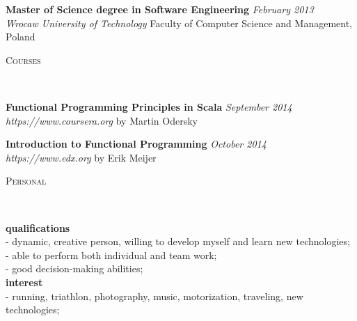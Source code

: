 \documentclass[9pt]{article}
\newenvironment{changemargin}[2]{%
  \begin{list}{}{%
      \setlength{\topsep}{0pt}%
      \setlength{\leftmargin}{#1}%
      \setlength{\rightmargin}{#2}%
      \setlength{\listparindent}{\parindent}%
      \setlength{\itemindent}{\parindent}%
      \setlength{\parsep}{\parskip}%
    }%
  \item[]}{\end{list}
}
\newcommand{\lineover}{
  \begin{changemargin}{-0.05in}{-0.05in}
    \vspace*{-8pt}
    \hrulefill \\
    \vspace*{-2pt}
  \end{changemargin}
}
\newcommand{\header}[1]{
	\begin{changemargin}{-0.5in}{-0.5in}
		\scshape{#1}\\
  	\lineover
	\end{changemargin}
}
\newenvironment{body} {
	\vspace*{-16pt}
	\begin{changemargin}{-0.25in}{-0.5in}
  }
	{\end{changemargin}
}
\begin{document}
\begin{body}
  \vspace{14pt}
  \textbf{Master of Science degree in Software Engineering}{} \hfill \emph{February 2013}{} \\
  \emph{Wrocaw University of Technology} Faculty of Computer Science and Management, Poland{} \\
\end{body}

\medskip


\header{Courses}

\begin{body}
  \vspace{14pt}
  \textbf{Functional Programming Principles in Scala}{} \hfill \emph{September 2014}{} \\
  \emph{https://www.coursera.org} by Martin Odersky{} \\
  \medskip

  \textbf{Introduction to Functional Programming}{} \hfill \emph{October 2014}{} \\
  \emph{https://www.edx.org} by Erik Meijer{} \\
\end{body}

\medskip


\header{Personal}

\begin{body}
  \vspace{14pt}
  \textbf{qualifications}{} \hfill {} \\
  - dynamic, creative person, willing to develop myself and learn new technologies;\hfill {} \\
  - able to perform both individual and team work;\hfill {} \\
  - good decision-making abilities; \hfill {} \\

  \medskip
  \textbf{interest}{} \hfill {} \\
  - running, triathlon, photography, music, motorization, traveling, new technologies; \hfill {} \\
\end{body}
\end{document}
